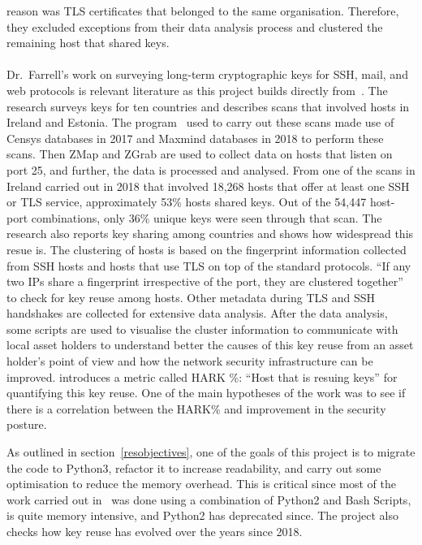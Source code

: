 reason was TLS certificates that belonged to the same organisation. Therefore, they excluded exceptions from their data analysis process and clustered the 
remaining host that shared keys.\\\\
Dr.~Farrell's work on surveying long-term cryptographic keys for SSH, mail, and web protocols is relevant literature as this project builds 
directly from~\cite{cryptoeprint:2018:299}. The research surveys keys for ten countries and describes scans that involved hosts 
in Ireland and Estonia. The program~\cite{sftcdsur24:online} used to carry out these scans made use of Censys databases in 2017 and Maxmind databases in 2018 
to perform these scans. Then ZMap and ZGrab are used to collect data on hosts that listen on port 25, and further, the data is processed and analysed.
From one of the scans in Ireland carried out in 2018 that involved 18,268 hosts that offer at least one SSH or TLS service, approximately 
53\% hosts shared keys. Out of the 54,447 host-port combinations, only 36\% unique keys were seen through that scan. The research also reports 
key sharing among countries and shows how widespread this resue is. The clustering of hosts is based on the fingerprint information collected from 
SSH hosts and hosts that use TLS on top of the standard protocols. ``If any two IPs share a fingerprint irrespective of the port, they are clustered 
together'' to check for key reuse among hosts. Other metadata during TLS and SSH handshakes are collected for extensive data analysis. 
After the data analysis, some scripts are used to visualise the cluster information to communicate with local asset holders to understand better the causes 
of this key reuse from an asset holder's point of view and how the network security infrastructure can be improved. 
\cite{cryptoeprint:2018:299} introduces a metric called HARK \%: ``Host that is resuing keys'' for quantifying this key reuse. One of the main 
hypotheses of the work was to see if there is a correlation between the HARK\% and improvement in the security posture.

\noindent As outlined in section~\ref*{resobjectives}, one of the goals of this project is to migrate the code to Python3, refactor it to increase readability, and 
carry out some optimisation to reduce the memory overhead. This is critical since most of the work carried out in~\cite{cryptoeprint:2018:299} was done using a combination of Python2 and Bash Scripts, is quite memory intensive, 
and Python2 has deprecated since. The project also checks how key reuse has evolved over the years since 2018. 

